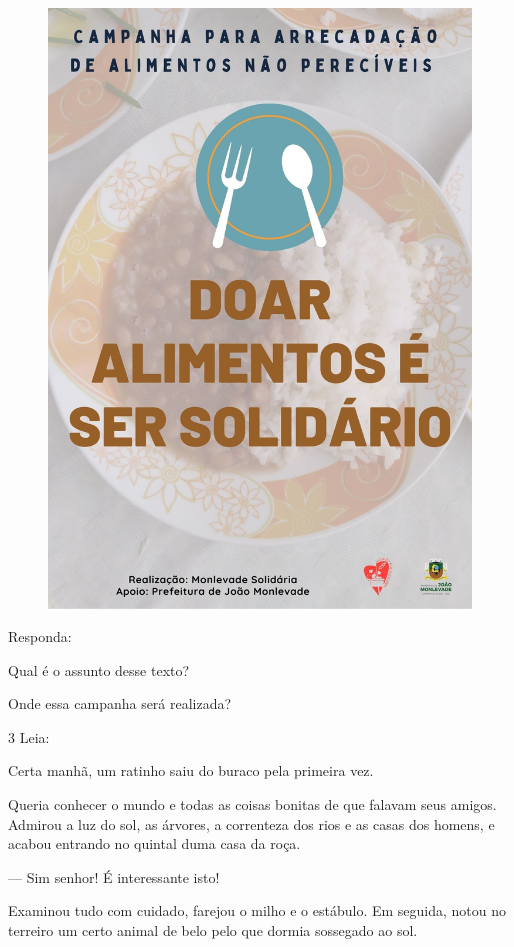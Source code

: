 \begin{figure}[H]
\centering
\includegraphics[width=.75\textwidth]{media/image119.jpeg}
\end{figure}


Responda:

\begin{escolha}
\item Qual é o assunto desse texto?\\

\item Onde essa campanha será realizada?\\
\end{escolha}

\num{3} Leia:


\begin{myquote}
Certa manhã, um ratinho saiu do buraco pela primeira vez.

Queria conhecer o mundo e todas as coisas bonitas de que
falavam seus amigos. Admirou a luz do sol, as árvores, a
correnteza dos rios e as casas dos homens, e acabou entrando no
quintal duma casa da roça.

--- Sim senhor! É interessante isto!

Examinou tudo com cuidado, farejou o milho e o estábulo.
Em seguida, notou no terreiro um certo animal de belo pelo que dormia
sossegado ao sol.

\end{myquote}

